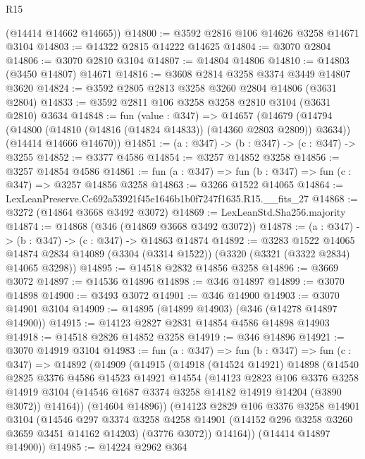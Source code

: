 \begin{lexlean}{R15}
\begin{coremodule}
      (@14414 @14662 @14665))
@14800 := @3592 @2816 @106 @14626 @3258 @14671 @3104
@14803 := @14322 @2815 @14222 @14625
@14804 := @3070 @2804
@14806 := @3070 @2810 @3104
@14807 := @14804 @14806
@14810 := @14803 (@3450 @14807) @14671
@14816 := @3608 @2814 @3258 @3374 @3449 @14807 @3620
@14824 := @3592 @2805 @2813 @3258 @3260 @2804 @14806 (@3631 @2804)
@14833 := @3592 @2811 @106 @3258 @3258 @2810 @3104 (@3631 @2810) @3634
@14848 := fun (value : @347) =>
  @14657
    (@14679
      (@14794 (@14800 (@14810 (@14816 (@14824 @14833)) (@14360 @2803 @2809)) @3634))
      (@14414 @14666 @14670))
@14851 := (a : @347) -> (b : @347) -> (c : @347) -> @3255
@14852 := @3377 @4586
@14854 := @3257 @14852 @3258
@14856 := @3257 @14854 @4586
@14861 := fun (a : @347) => fun (b : @347) => fun (c : @347) => @3257 @14856 @3258
@14863 := @3266 @1522 @14065
@14864 := LexLeanPreserve.Cc692a53921f45e1646b1b0f7247f1635.R15.__fits_27
@14868 := @3272 (@14864 @3668 @3492 @3072)
@14869 := LexLeanStd.Sha256.majority
@14874 := @14868 (@346 (@14869 @3668 @3492 @3072))
@14878 := (a : @347) -> (b : @347) -> (c : @347) -> @14863 @14874
@14892 := @3283
    @1522
    @14065
    @14874
    @2834
    @14089
    (@3304 (@3314 @1522))
    (@3320 (@3321 (@3322 @2834) @14065 @3298))
@14895 := @14518 @2832 @14856 @3258
@14896 := @3669 @3072
@14897 := @14536 @14896
@14898 := @346 @14897
@14899 := @3070 @14898
@14900 := @3493 @3072
@14901 := @346 @14900
@14903 := @3070 @14901 @3104
@14909 := @14895 (@14899 @14903) (@346 (@14278 @14897 @14900))
@14915 := @14123 @2827 @2831 @14854 @4586 @14898 @14903
@14918 := @14518 @2826 @14852 @3258
@14919 := @346 @14896
@14921 := @3070 @14919 @3104
@14983 := fun (a : @347) =>
  fun (b : @347) =>
  fun (c : @347) =>
  @14892
    (@14909
      (@14915
        (@14918
          (@14524 @14921)
          @14898
          (@14540
            @2825
            @3376
            @4586
            @14523
            @14921
            @14554
            (@14123
              @2823
              @106
              @3376
              @3258
              @14919
              @3104
              (@14546 @1687 @3374 @3258 @14182 @14919 @14204 (@3890 @3072))
              @14164))
          (@14604 @14896))
        (@14123
          @2829
          @106
          @3376
          @3258
          @14901
          @3104
          (@14546
            @297
            @3374
            @3258
            @4258
            @14901
            (@14152 @296 @3258 @3260 @3659 @3451 @14162 @14203)
            (@3776 @3072))
          @14164))
      (@14414 @14897 @14900))
@14985 := @14224 @2962 @364

\end{coremodule}
\end{lexlean}
